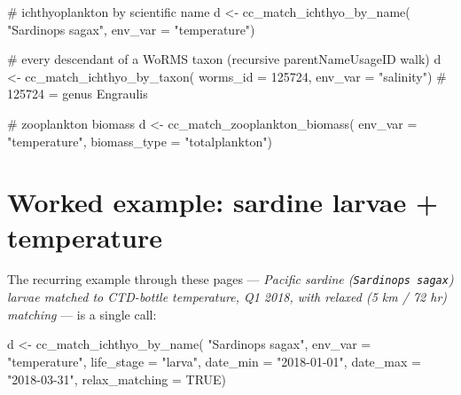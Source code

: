 \documentclass[
  letterpaper,
  DIV=11,
  numbers=noendperiod]{scrreprt}
\newenvironment{Shaded}{\begin{snugshade}}{\end{snugshade}}
\newcommand{\AttributeTok}[1]{\textcolor[rgb]{0.40,0.45,0.13}{#1}}
\newcommand{\CommentTok}[1]{\textcolor[rgb]{0.37,0.37,0.37}{#1}}
\newcommand{\ConstantTok}[1]{\textcolor[rgb]{0.56,0.35,0.01}{#1}}
\newcommand{\DecValTok}[1]{\textcolor[rgb]{0.68,0.00,0.00}{#1}}
\newcommand{\FunctionTok}[1]{\textcolor[rgb]{0.28,0.35,0.67}{#1}}
\newcommand{\NormalTok}[1]{\textcolor[rgb]{0.00,0.23,0.31}{#1}}
\newcommand{\OtherTok}[1]{\textcolor[rgb]{0.00,0.23,0.31}{#1}}
\newcommand{\StringTok}[1]{\textcolor[rgb]{0.13,0.47,0.30}{#1}}
\begin{document}
\begin{Shaded}
\begin{Highlighting}[]
\CommentTok{\# ichthyoplankton by scientific name}
\NormalTok{d }\OtherTok{\textless{}{-}} \FunctionTok{cc\_match\_ichthyo\_by\_name}\NormalTok{(}
  \StringTok{"Sardinops sagax"}\NormalTok{, }\AttributeTok{env\_var =} \StringTok{"temperature"}\NormalTok{)}

\CommentTok{\# every descendant of a WoRMS taxon (recursive parentNameUsageID walk)}
\NormalTok{d }\OtherTok{\textless{}{-}} \FunctionTok{cc\_match\_ichthyo\_by\_taxon}\NormalTok{(}
  \AttributeTok{worms\_id =} \DecValTok{125724}\NormalTok{, }\AttributeTok{env\_var =} \StringTok{"salinity"}\NormalTok{)   }\CommentTok{\# 125724 = genus Engraulis}

\CommentTok{\# zooplankton biomass}
\NormalTok{d }\OtherTok{\textless{}{-}} \FunctionTok{cc\_match\_zooplankton\_biomass}\NormalTok{(}
  \AttributeTok{env\_var =} \StringTok{"temperature"}\NormalTok{, }\AttributeTok{biomass\_type =} \StringTok{"totalplankton"}\NormalTok{)}
\end{Highlighting}
\end{Shaded}

\section{Worked example: sardine larvae +
temperature}\label{worked-example-sardine-larvae-temperature}

The recurring example through these pages --- \emph{Pacific sardine
(\texttt{Sardinops\ sagax}) larvae matched to CTD-bottle temperature, Q1
2018, with relaxed (5 km / 72 hr) matching} --- is a single call:

\begin{Shaded}
\begin{Highlighting}[]
\NormalTok{d }\OtherTok{\textless{}{-}} \FunctionTok{cc\_match\_ichthyo\_by\_name}\NormalTok{(}
  \StringTok{"Sardinops sagax"}\NormalTok{,}
  \AttributeTok{env\_var        =} \StringTok{"temperature"}\NormalTok{,}
  \AttributeTok{life\_stage     =} \StringTok{"larva"}\NormalTok{,}
  \AttributeTok{date\_min       =} \StringTok{"2018{-}01{-}01"}\NormalTok{,}
  \AttributeTok{date\_max       =} \StringTok{"2018{-}03{-}31"}\NormalTok{,}
  \AttributeTok{relax\_matching =} \ConstantTok{TRUE}\NormalTok{)}
\end{Highlighting}
\end{Shaded}
\end{document}
